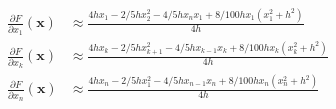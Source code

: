 \begin{align*}
    \frac{\partial F }{\partial x_1} (\mathbf{x}) & \approx \frac{4hx_1 - 2/5 h x_2^2 - 4/5 h x_n x_1 + 8/100 h x_1 (x_1^2 + h^2)}{4h} \\
    \frac{\partial F }{\partial x_k} (\mathbf{x}) & \approx \frac{4hx_k - 2/5 h x_{k+1}^2 - 4/5 h x_{k-1} x_k + 8/100 h x_k (x_k^2 + h^2)}{4h} \\
    \frac{\partial F }{\partial x_n} (\mathbf{x}) & \approx \frac{4hx_n - 2/5 h x_{1}^2 - 4/5 h x_{n-1} x_n + 8/100 h x_n (x_n^2 + h^2)}{4h}
\end{align*}


